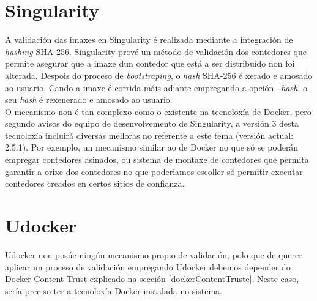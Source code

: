 \section{Singularity}

A validación das imaxes en Singularity é realizada mediante a integración de \textit{hashing} \gls{SHA}-256. Singularity prové un método de validación dos contedores que permite asegurar que a imaxe dun contedor que está a ser distribuído non foi alterada. Despois do proceso de \textit{bootstraping}, o \textit{hash} \gls{SHA}-256 é xerado e amosado ao usuario. Cando a imaxe é corrida máis adiante empregando a opción {\it --hash}, o seu \textit{hash} é rexenerado e amosado ao usuario.\\

O mecanismo non é tan complexo como o existente na tecnoloxía de Docker, pero segundo avisos do equipo de desenvolvemento de Singularity, a versión 3 desta tecnoloxía incluirá diversas melloras no referente a este tema \cite{SingularityLabNotes} (versión actual: 2.5.1). Por exemplo, un mecanismo similar ao de Docker no que só se poderán empregar contedores asinados, ou sistema de montaxe de contedores que permita garantir a orixe dos contedores no que poderiamos escoller só permitir executar contedores creados en certos sitios de confianza. \cite{SingularityRemoteBuild}

\section{Udocker}

Udocker non posúe ningún mecanismo propio de validación, polo que de querer aplicar un proceso de validación empregando Udocker debemos depender do Docker Content Trust explicado na sección \ref{dockerContentTruste}. Neste caso, sería preciso ter a tecnoloxía Docker instalada no sistema.
